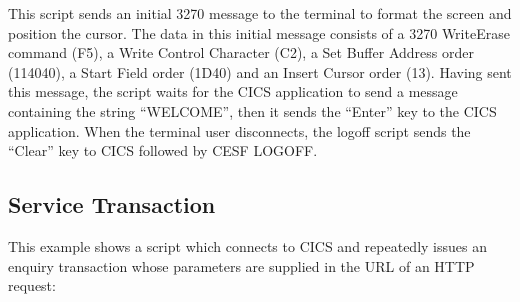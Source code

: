 \documentclass[letterpaper,10pt,english]{sphinxmanual}
\begin{document}
\sphinxAtStartPar
{}

\sphinxAtStartPar
This script sends an initial 3270 message to the terminal to format the screen and position the cursor. The data in this initial message consists of a 3270 Write\sphinxhyphen{}Erase command (F5), a Write Control Character (C2), a Set Buffer Address order (114040), a Start Field order (1D40) and an Insert Cursor order (13). Having sent this message, the script waits for the CICS application to send a message containing the string “WELCOME”, then it sends the “Enter” key to the CICS application. When the terminal user disconnects, the logoff script sends the “Clear” key to CICS followed by CESF LOGOFF.

\ignorespaces 

\subsection{Service Transaction}
\label{\detokenize{connectivity_guide:service-transaction}}\label{\detokenize{connectivity_guide:index-131}}
\sphinxAtStartPar
This example shows a script which connects to CICS and repeatedly issues an enquiry transaction whose parameters are supplied in the URL of an HTTP request:
\end{document}
